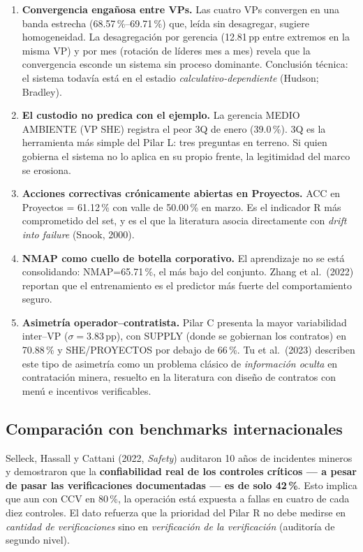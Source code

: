 \documentclass[12pt,a4paper]{article}
\begin{document}
\begin{enumerate}
\item \textbf{Convergencia engañosa entre VPs.} Las cuatro VPs convergen en una banda estrecha (68.57\,\%--69.71\,\%) que, leída sin desagregar, sugiere homogeneidad. La desagregación por gerencia (12.81\,pp entre extremos en la misma VP) y por mes (rotación de líderes mes a mes) revela que la convergencia esconde un sistema sin proceso dominante. Conclusión técnica: el sistema todavía está en el estadio \emph{calculativo-dependiente} (Hudson; Bradley).

\item \textbf{El custodio no predica con el ejemplo.} La gerencia MEDIO AMBIENTE (VP SHE) registra el peor 3Q de enero (39.0\,\%). 3Q es la herramienta más simple del Pilar L: tres preguntas en terreno. Si quien gobierna el sistema no lo aplica en su propio frente, la legitimidad del marco se erosiona.

\item \textbf{Acciones correctivas crónicamente abiertas en Proyectos.} ACC en Proyectos = 61.12\,\% con valle de 50.00\,\% en marzo. Es el indicador R más comprometido del set, y es el que la literatura asocia directamente con \emph{drift into failure} (Snook, 2000).

\item \textbf{NMAP como cuello de botella corporativo.} El aprendizaje no se está consolidando: NMAP=65.71\,\%, el más bajo del conjunto. Zhang et al.\ (2022) reportan que el entrenamiento es el predictor más fuerte del comportamiento seguro.

\item \textbf{Asimetría operador--contratista.} Pilar C presenta la mayor variabilidad inter--VP ($\sigma=3.83$\,pp), con SUPPLY (donde se gobiernan los contratos) en 70.88\,\% y SHE/PROYECTOS por debajo de 66\,\%. Tu et al.\ (2023) describen este tipo de asimetría como un problema clásico de \emph{información oculta} en contratación minera, resuelto en la literatura con diseño de contratos con menú e incentivos verificables.
\end{enumerate}

\subsection{Comparación con benchmarks internacionales}

Selleck, Hassall y Cattani (2022, \emph{Safety}) auditaron 10 años de incidentes mineros y demostraron que la \textbf{confiabilidad real de los controles críticos --- a pesar de pasar las verificaciones documentadas --- es de solo 42\,\%}. Esto implica que aun con CCV en 80\,\%, la operación está expuesta a fallas en cuatro de cada diez controles. El dato refuerza que la prioridad del Pilar R no debe medirse en \emph{cantidad de verificaciones} sino en \emph{verificación de la verificación} (auditoría de segundo nivel).
\end{document}
